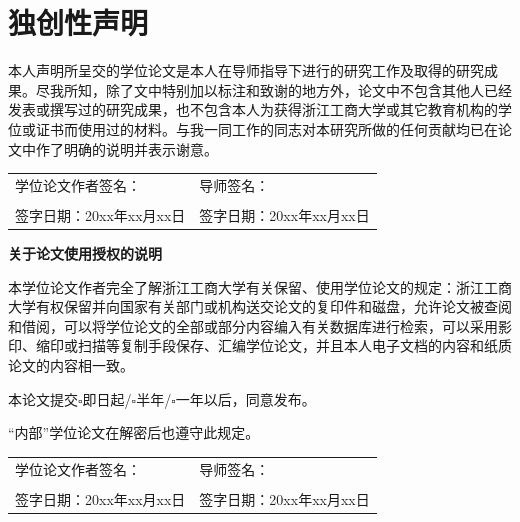 \newpage
\songti\xiaosi
\chapter*{\heiti\sanhao\textbf{独\hspace{1em}创\hspace{1em}性\hspace{1em}声\hspace{1em}明}}

本人声明所呈交的学位论文是本人在导师指导下进行的研究工作及取得的研究成果。尽我所知，除了文中特别加以标注和致谢的地方外，论文中不包含其他人已经发表或撰写过的研究成果，也不包含本人为获得浙江工商大学或其它教育机构的学位或证书而使用过的材料。与我一同工作的同志对本研究所做的任何贡献均已在论文中作了明确的说明并表示谢意。
\par

\vspace{30bp}
\noindent\begin{tabular}{p{9.5cm}p{9.5cm}}
  学位论文作者签名： & 导师签名： \\\\
  签字日期：20xx年xx月xx日 & 签字日期：20xx年xx月xx日
\end{tabular}


\vspace{40pt}
\begin{center}
  {\heiti\sanhao\textbf{关于论文使用授权的说明}}
\end{center}
\par
\vspace{20pt}
本学位论文作者完全了解浙江工商大学有关保留、使用学位论文的规定：浙江工商大学有权保留并向国家有关部门或机构送交论文的复印件和磁盘，允许论文被查阅和借阅，可以将学位论文的全部或部分内容编入有关数据库进行检索，可以采用影印、缩印或扫描等复制手段保存、汇编学位论文，并且本人电子文档的内容和纸质论文的内容相一致。

本论文提交$\square$即日起/$\square$半年/$\square$一年以后，同意发布。

“内部”学位论文在解密后也遵守此规定。
\par
\vspace{30bp}
\noindent\begin{tabular}{p{9.5cm}p{9.5cm}}
  学位论文作者签名： & 导师签名： \\\\
  签字日期：20xx年xx月xx日 & 签字日期：20xx年xx月xx日
\end{tabular}

